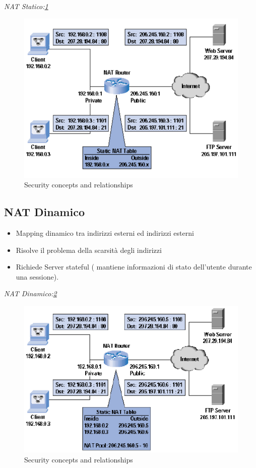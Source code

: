 \documentclass[12pt]{article}
\begin{document}
		\textit{NAT Statico:\ref{fig:2}}
		\begin{figure}[h!]
			\centering
			\includegraphics[scale=0.40]{img/static.PNG}
			\caption{Security concepts and relationships\label{fig:2}}
		\end{figure}
		
		\subsection{NAT Dinamico}
			\begin{itemize}
				\item Mapping dinamico tra indirizzi esterni ed indirizzi esterni
				\item Risolve il problema della scarsità degli indirizzi
				\item Richiede Server stateful ( mantiene informazioni di stato dell'utente durante una sessione).
			\end{itemize}
		\textit{NAT Dinamico:\ref{fig:3}}
		\begin{figure}[h!]
			\centering
			\includegraphics[scale=0.60]{img/dinamic.PNG}
			\caption{Security concepts and relationships\label{fig:3}}
		\end{figure}
		
\end{document}
